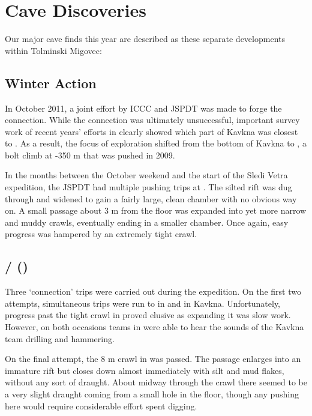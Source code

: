 
\section{Cave Discoveries}

Our major cave finds this year are described as these separate
developments within Tolminski Migovec:


\subsection{Winter Action}

In October 2011, a joint effort by ICCC and JSPDT was made to forge the
connection. While the connection was ultimately unsuccessful, important
survey work of recent years' efforts in  clearly
showed which part of Kavkna was closest to . As a
result, the focus of exploration shifted from the bottom of Kavkna to
, a bolt climb at -350 m that was pushed in 2009.

In the months between the October weekend and the start of the Sledi
Vetra expedition, the JSPDT had multiple pushing trips at . The silted rift was dug through and widened to gain a fairly
large, clean chamber with no obvious way on. A small passage about 3 m
from the floor was expanded into yet more narrow and muddy crawls,
eventually ending in a smaller chamber. Once again, easy progress was
hampered by an extremely tight crawl.


\subsection{\texorpdfstring{ /  ()}{Vrtnarija / M2 (Kavkna Jama)}}

Three `connection' trips were carried out during the expedition. On the
first two attempts, simultaneous trips were run to  in
 and  in Kavkna. Unfortunately,
progress past the tight crawl in  proved elusive as
expanding it was slow work. However, on both occasions teams in
 were able to hear the sounds of the Kavkna team
drilling and hammering.

On the final attempt, the 8 m crawl in  was passed.
The passage enlarges into an immature rift but closes down almost
immediately with silt and mud flakes, without any sort of draught. About
midway through the crawl there seemed to be a very slight draught coming
from a small hole in the floor, though any pushing here would require
considerable effort spent digging.


